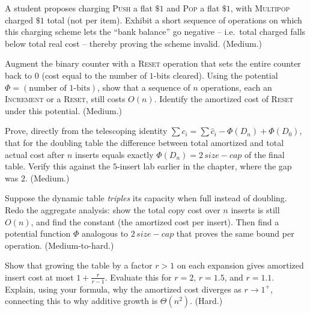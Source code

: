 \begin{exercise}
A student proposes charging \textsc{Push} a flat $\$1$ and \textsc{Pop} a flat
$\$1$, with \textsc{Multipop} charged $\$1$ total (not per item). Exhibit a short
sequence of operations on which this charging scheme lets the ``bank balance'' go
negative -- i.e.\ total charged falls below total real cost -- thereby proving the
scheme invalid. (Medium.)
\end{exercise}

\begin{exercise}
Augment the binary counter with a \textsc{Reset} operation that sets the entire
counter back to $0$ (cost equal to the number of $1$-bits cleared). Using the
potential $\Phi = (\text{number of }1\text{-bits})$, show that a sequence of $n$
operations, each an \textsc{Increment} or a \textsc{Reset}, still costs $O(n)$.
Identify the amortized cost of \textsc{Reset} under this potential. (Medium.)
\end{exercise}

\begin{exercise}
Prove, directly from the telescoping identity
$\sum c_i = \sum \hat{c}_i - \Phi(D_n) + \Phi(D_0)$, that for the doubling table
the difference between total amortized and total actual cost after $n$ inserts
equals exactly $\Phi(D_n) = 2\,\mathit{size} - \mathit{cap}$ of the final table.
Verify this against the $5$-insert lab earlier in the chapter, where the gap was
$2$. (Medium.)
\end{exercise}

\begin{exercise}
Suppose the dynamic table \emph{triples} its capacity when full instead of
doubling. Redo the aggregate analysis: show the total copy cost over $n$ inserts is
still $O(n)$, and find the constant (the amortized cost per insert). Then find a
potential function $\Phi$ analogous to $2\,\mathit{size} - \mathit{cap}$ that
proves the same bound per operation. (Medium-to-hard.)
\end{exercise}

\begin{exercise}
Show that growing the table by a factor $r > 1$ on each expansion gives amortized
insert cost at most $1 + \frac{r}{r-1}$. Evaluate this for $r = 2$, $r = 1.5$, and
$r = 1.1$. Explain, using your formula, why the amortized cost diverges as
$r \to 1^{+}$, connecting this to why additive growth is $\Theta(n^2)$. (Hard.)
\end{exercise}

